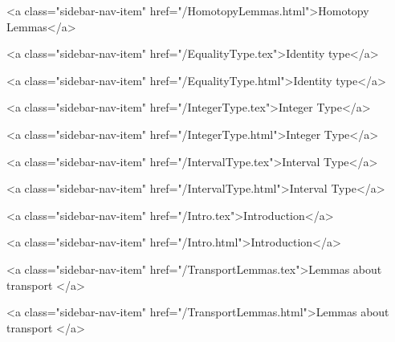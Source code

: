       
        
          <a class="sidebar-nav-item" href="/HomotopyLemmas.html">Homotopy Lemmas</a>
        
      
    
      
        
          <a class="sidebar-nav-item" href="/EqualityType.tex">Identity type</a>
        
      
    
      
        
          <a class="sidebar-nav-item" href="/EqualityType.html">Identity type</a>
        
      
    
      
        
          <a class="sidebar-nav-item" href="/IntegerType.tex">Integer Type</a>
        
      
    
      
        
          <a class="sidebar-nav-item" href="/IntegerType.html">Integer Type</a>
        
      
    
      
        
          <a class="sidebar-nav-item" href="/IntervalType.tex">Interval Type</a>
        
      
    
      
        
          <a class="sidebar-nav-item" href="/IntervalType.html">Interval Type</a>
        
      
    
      
        
          <a class="sidebar-nav-item" href="/Intro.tex">Introduction</a>
        
      
    
      
        
          <a class="sidebar-nav-item" href="/Intro.html">Introduction</a>
        
      
    
      
        
          <a class="sidebar-nav-item" href="/TransportLemmas.tex">Lemmas about transport </a>
        
      
    
      
        
          <a class="sidebar-nav-item" href="/TransportLemmas.html">Lemmas about transport </a>
        
      
    
